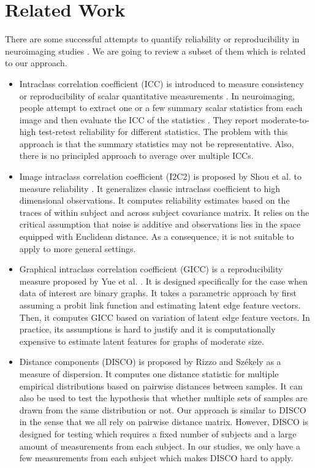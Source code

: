 \documentclass{article}
\begin{document}
\section{Related Work}
There are some successful attempts to quantify reliability or reproducibility in neuroimaging studies \cite{shrout1979intraclass}\cite{strother2002quantitative}\cite{rizzo2010disco}\cite{zuo2010reliable}\cite{braun2012test}\cite{shou2013quantifying}\cite{yue2015estimating}. We are going to review a subset of them which is related to our approach.
\begin{itemize}
	\item Intraclass correlation coefficient (ICC) is introduced to measure consistency or reproducibility of scalar quantitative measurements \cite{shrout1979intraclass}. In neuroimaging, people attempt to extract one or a few summary scalar statistics from each image and then evaluate the ICC of the statistics \cite{zuo2010reliable}\cite{braun2012test}. They report moderate-to-high test-retest reliability for different statistics. The problem with this approach is that the summary statistics may not be representative. Also, there is no principled approach to average over multiple ICCs. 
	\item Image intraclass correlation coefficient (I2C2) is proposed by Shou et al. to measure reliability  \cite{shou2013quantifying}. It generalizes classic intraclass coefficient to high dimensional observations. It computes reliability estimates based on the traces of within subject and across subject covariance matrix. It relies on the critical assumption that noise is additive and observations lies in the space equipped with Euclidean distance. As a consequence, it is not suitable to apply to more general settings. 
	\item Graphical intraclass correlation coefficient (GICC) is a reproducibility measure proposed by Yue et al. \cite{yue2015estimating}. It is designed specifically for the case when data of interest are binary graphs. It takes a parametric approach by first assuming a probit link function and estimating latent edge feature vectors. Then, it computes GICC based on variation of latent edge feature vectors. In practice, its assumptions is hard to justify and it is computationally expensive to estimate latent features for graphs of moderate size. 
	\item Distance components (DISCO) is proposed by Rizzo and Sz{\'e}kely as a measure of dispersion\cite{rizzo2010disco}. It computes one distance statistic for multiple empirical distributions based on pairwise distances between samples. It can also be used to test the hypothesis that whether multiple sets of samples are drawn from the same distribution or not. Our approach is similar to DISCO in the sense that we all rely on pairwise distance matrix. However, DISCO is designed for testing which requires a fixed number of subjects and a large amount of measurements from each subject. In our studies, we only have a few measurements from each subject which makes DISCO hard to apply.  

\end{itemize}
\end{document}
